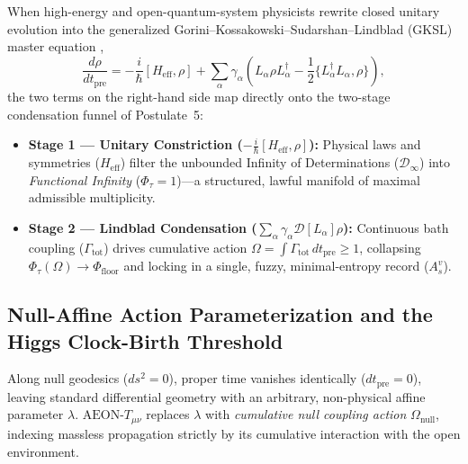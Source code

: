 \documentclass[11pt,a4paper]{article}
\begin{document}
When high-energy and open-quantum-system physicists rewrite closed unitary evolution into the generalized Gorini--Kossakowski--Sudarshan--Lindblad (GKSL) master equation \cite{Lindblad1976, GKS1976, BreuerPetruccione2002},
\begin{equation}
\frac{d\rho}{dt_{\mathrm{pre}}} = -\frac{i}{\hbar}[H_{\mathrm{eff}}, \rho] + \sum_{\alpha} \gamma_\alpha \left( L_\alpha \rho L_\alpha^\dagger - \frac{1}{2}\{L_\alpha^\dagger L_\alpha, \rho\} \right),
\end{equation}
the two terms on the right-hand side map directly onto the two-stage condensation funnel of Postulate~5:
\begin{itemize}
    \item \textbf{Stage 1 --- Unitary Constriction ($-\frac{i}{\hbar}[H_{\mathrm{eff}}, \rho]$):} Physical laws and symmetries ($H_{\mathrm{eff}}$) filter the unbounded Infinity of Determinations ($\mathcal{D}_\infty$) into \emph{Functional Infinity} ($\Phi_\tau = 1$)---a structured, lawful manifold of maximal admissible multiplicity.
    \item \textbf{Stage 2 --- Lindblad Condensation ($\sum_\alpha \gamma_\alpha \mathcal{D}[L_\alpha]\rho$):} Continuous bath coupling ($\Gamma_{\mathrm{tot}}$) drives cumulative action $\Omega = \int \Gamma_{\mathrm{tot}}\,dt_{\mathrm{pre}} \ge 1$, collapsing $\Phi_\tau(\Omega) \to \Phi_{\mathrm{floor}}$ and locking in a single, fuzzy, minimal-entropy record ($A_s^v$).
\end{itemize}

\subsection{Null-Affine Action Parameterization and the Higgs Clock-Birth Threshold}

Along null geodesics ($ds^2 = 0$), proper time vanishes identically ($dt_{\mathrm{pre}} = 0$), leaving standard differential geometry with an arbitrary, non-physical affine parameter $\lambda$. $\text{AEON-}T_{\mu\nu}$ replaces $\lambda$ with \emph{cumulative null coupling action} $\Omega_{\mathrm{null}}$, indexing massless propagation strictly by its cumulative interaction with the open environment.
\end{document}
